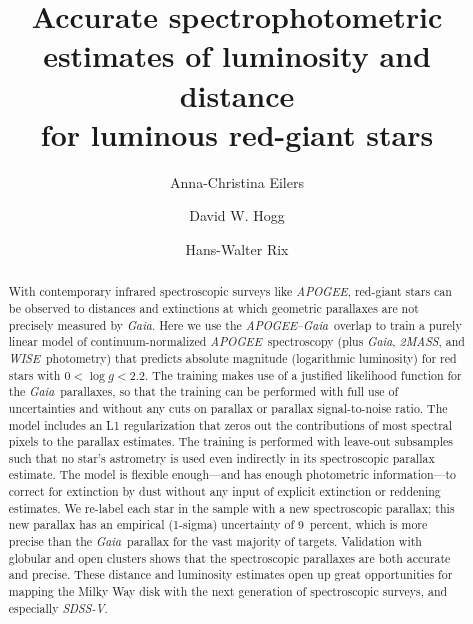 \documentclass[modern]{aastex62}
\newcommand{\acronym}[1]{{\small{#1}}}
\newcommand{\project}[1]{\textsl{#1}}
\newcommand{\apogee}{\project{\acronym{APOGEE}}}
\newcommand{\gaia}{\project{Gaia}}
\newcommand{\wise}{\project{\acronym{WISE}}}
\newcommand{\zmass}{\project{\acronym{2MASS}}}
\newcommand{\sdssv}{\project{\acronym{SDSS-V}}}
\newcommand{\logg}{\log g}
\begin{document}
\sloppy\sloppypar\raggedbottom\frenchspacing %

\title{\textbf{%
Accurate spectrophotometric estimates of luminosity and distance\\
for luminous red-giant stars%
}}

\author[0000-0003-2895-6218]{Anna-Christina Eilers}

\author[0000-0003-2866-9403]{David W. Hogg}

\author[0000-0003-4996-9069]{Hans-Walter Rix}

\begin{abstract}\noindent
With contemporary infrared spectroscopic surveys like \apogee,
red-giant stars can be observed to distances and extinctions
at which geometric parallaxes are not precisely measured by \gaia.
Here we use the \apogee--\gaia\ overlap to train a purely linear model of
continuum-normalized \apogee\ spectroscopy
(plus \gaia, \zmass, and \wise\ photometry)
that predicts absolute magnitude (logarithmic luminosity) for red stars with $0<\logg<2.2$.
The training makes use of a justified likelihood function for the \gaia\ parallaxes,
so that the training can be performed with full use of uncertainties and
without any cuts on parallax or parallax signal-to-noise ratio.
The model includes an L1 regularization that zeros out the contributions of
most spectral pixels to the parallax estimates.
The training is performed
with leave-out subsamples such that no star's astrometry is used even indirectly in its
spectroscopic parallax estimate.
The model is flexible enough---and has enough photometric information---to
correct for extinction by dust without any
input of explicit extinction or reddening estimates.
We re-label each star in the sample
with a new spectroscopic parallax; this new parallax has an empirical (1-sigma)
uncertainty of 9~percent, which is more precise than the \gaia\ parallax
for the vast majority of targets.
Validation with globular and open clusters shows that the spectroscopic parallaxes
are both accurate and precise.
These distance and luminosity estimates open up great opportunities for
mapping the Milky Way disk with the next
generation of spectroscopic surveys, and especially \sdssv.
\end{abstract}
\end{document}
